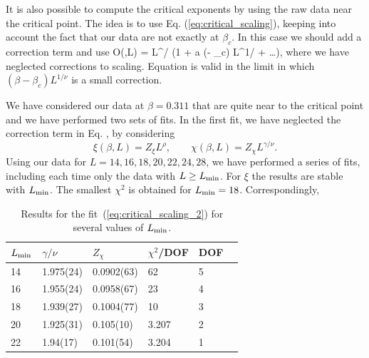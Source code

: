 \documentclass[12pt]{article}
\begin{document}
It is also possible to compute the critical exponents by using the 
raw data near the critical point. The idea is to use Eq. 
(\ref{eq:critical_scaling}), keeping into account the fact that 
our data are not exactly at $\beta_c$. In this case 
we should add a correction term and use
\be
{\cal O}(\beta,L) = L^{\gamma/\nu} 
    \left(1 + a (\beta - \beta_c) L^{1/ \nu} + \ldots\right),
\label{FSS-quasiatTc}
\ee
where we have neglected corrections to scaling. 
Equation  is valid in the limit in which 
$(\beta - \beta_c) L^{1/\nu}$ is a small correction.

We have considered our data at $\beta = 0.311$ that are quite near to the
critical point and we have performed two sets of fits. In the 
first fit, we have neglected the correction term
in Eq. , by considering
\begin{equation}
  \xi(\beta,L) = Z_\xi L^{\rho}, \qquad
  \chi( \beta,L) = Z_\chi L^{\gamma/\nu}.
  \label{eq:critical_scaling_2}
\end{equation}
Using our data for 
$L=14,16,18,20,22,24,28$, we have performed a series of fits,
including each time
only the data with $L \ge L_{\rm min}$. For $\xi$ the results are stable 
with $L_{\rm min}$. The smallest $\chi^2$ is obtained for $L_{\rm min}=18$.
Correspondingly, 
%
\begin{table}
\begin{center}
\begin{tabular}{|l|l|l|l|l|l|}
\hline
$L_{\rm min}$ & $\gamma/\nu$ & $Z_\chi$ & $\chi^2$/DOF & DOF \\
\hline
14 & 1.975(24) & 0.0902(63) & 62 &5 \\
16 & 1.955(24) & 0.0958(67) & 23  & 4 \\
18 & 1.939(27) & 0.1004(77) & 10  & 3 \\
20 & 1.925(31) & 0.105(10) & 3.207 & 2 \\
22 & 1.94(17)  & 0.101(54) & 3.204 & 1 \\
\hline
\end{tabular}
\end{center}
\caption{Results for the fit~(\ref{eq:critical_scaling_2}) 
for several values of $L_{\rm min}$. 
}
\label{results-fit-critical-scaling}
\end{table}  
\end{document}
